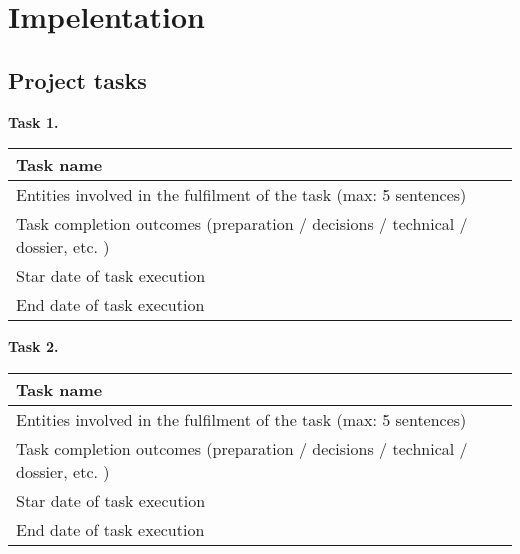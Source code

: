\chapter{Impelentation}\label{ch:impelentation}


\section{Project tasks}\label{sec:project-tasks}
\begin{description}
    \item \hspace*{8mm}\textbf{Task 1.}\\[5mm]
    \begin{tabular}{|p{5cm}|p{7cm}|}
        \hline
        Task name                                                                       & \\
        \hline
        Entities involved in the fulfilment of the task (max: 5 sentences)              & \\
        \hline
        Task completion outcomes (preparation / decisions / technical / dossier, etc. ) & \\
        \hline
        Star date of task execution                                                     & \\
        \hline
        End date of task execution                                                      & \\
        \hline
    \end{tabular}
    \item \hspace*{8mm}\textbf{Task 2.}\\[5mm]
    \begin{tabular}{|p{5cm}|p{7cm}|}
        \hline
        Task name                                                                       & \\
        \hline
        Entities involved in the fulfilment of the task (max: 5 sentences)              & \\
        \hline
        Task completion outcomes (preparation / decisions / technical / dossier, etc. ) & \\
        \hline
        Star date of task execution                                                     & \\
        \hline
        End date of task execution                                                      & \\
        \hline
    \end{tabular}

\end{description}
